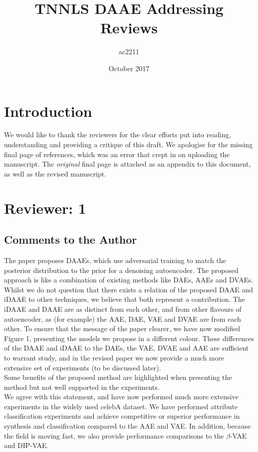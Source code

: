 \documentclass{article}
\title{TNNLS DAAE Addressing Reviews}
\author{ac2211 }
\date{October 2017}
\begin{document}
\maketitle
\section*{Introduction}
We would like to thank the reviewers for the clear efforts put into reading, understanding and providing a critique of this draft. We apologise for the missing final page of references, which was an error that crept in on uploading the manuscript.  The {\em original} final page is attached as an appendix to this document, as well as the revised manuscript. \\

\section*{Reviewer: 1}
\subsection*{Comments to the Author}
{\color{blue} The paper proposes DAAEs, which use adversarial training to match the posterior distribution to the prior for a denoising autoencoder. The proposed approach is like a combination of existing methods like DAEs, AAEs and DVAEs.}\\

Whilst we do not question that there exists a relation of the proposed DAAE and iDAAE to other techniques, we believe that both represent a contribution. The iDAAE and DAAE are as distinct from each other, and from other flavours of autoencoder, as (for example) the AAE, DAE, VAE and DVAE are from each other.  To ensure that the message of the paper clearer, we have now modified Figure 1, presenting the models we propose in a different colour.  These differences of the DAAE and iDAAE to the DAEs, the VAE, DVAE and AAE are sufficient to warrant study, and in the revised paper we now provide a much more extensive set of experiments (to be discussed later).\\


{\color{blue} Some benefits of the proposed method are highlighted when presenting the method but not well supported in the experiments. }\\

We agree with this statement, and have now performed much more extensive experiments in the widely used celebA dataset. We have performed attribute classification experiments and achieve competitive or superior performance in synthesis and classification compared to the AAE and VAE. In addition, because the field is moving fast, we also provide performance comparisons to the $\beta$-VAE and DIP-VAE.\\
\end{document}
